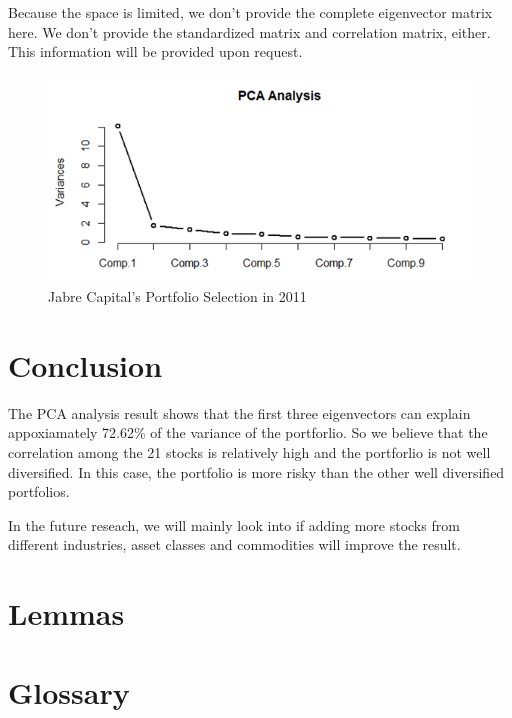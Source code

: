 \documentclass[oneside,12pt]{report}
\begin{document}
Because the space is limited, we don't provide the complete eigenvector matrix here. We don't provide the standardized matrix and correlation matrix, either. This information will be provided upon request.
\begin{figure}[ht]
    \begin{center}
        \includegraphics[width=\textwidth]{5.png}
    \end{center}
    \caption{Jabre Capital's Portfolio Selection in 2011}
    \label{fig:eigenvector}
\end{figure}


\chapter{Conclusion}\label{Conclusion}
The PCA analysis result shows that the first three eigenvectors can explain appoxiamately 72.62\% of the variance of the portforlio. So we believe that the correlation among the 21 stocks is relatively high and the portforlio is not well diversified. In this case, the portfolio is more risky than the other well diversified portfolios. 

In the future reseach, we will mainly look into if adding more stocks from different industries, asset classes and commodities will improve the result.

%
%
%
%
%
%


\appendix
{}

\chapter{Lemmas}\label{Lemma}

\chapter{Glossary}\label{Glossary}
\end{document}
